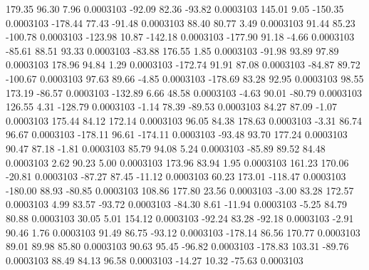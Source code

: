       179.35       96.30        7.96     0.0003103
      -92.09       82.36      -93.82     0.0003103
      145.01        9.05     -150.35     0.0003103
     -178.44       77.43      -91.48     0.0003103
       88.40       80.77        3.49     0.0003103
       91.44       85.23     -100.78     0.0003103
     -123.98       10.87     -142.18     0.0003103
     -177.90       91.18       -4.66     0.0003103
      -85.61       88.51       93.33     0.0003103
      -83.88      176.55        1.85     0.0003103
      -91.98       93.89       97.89     0.0003103
      178.96       94.84        1.29     0.0003103
     -172.74       91.91       87.08     0.0003103
      -84.87       89.72     -100.67     0.0003103
       97.63       89.66       -4.85     0.0003103
     -178.69       83.28       92.95     0.0003103
       98.55      173.19      -86.57     0.0003103
     -132.89        6.66       48.58     0.0003103
       -4.63       90.01      -80.79     0.0003103
      126.55        4.31     -128.79     0.0003103
       -1.14       78.39      -89.53     0.0003103
       84.27       87.09       -1.07     0.0003103
      175.44       84.12      172.14     0.0003103
       96.05       84.38      178.63     0.0003103
       -3.31       86.74       96.67     0.0003103
     -178.11       96.61     -174.11     0.0003103
      -93.48       93.70      177.24     0.0003103
       90.47       87.18       -1.81     0.0003103
       85.79       94.08        5.24     0.0003103
      -85.89       89.52       84.48     0.0003103
        2.62       90.23        5.00     0.0003103
      173.96       83.94        1.95     0.0003103
      161.23      170.06      -20.81     0.0003103
      -87.27       87.45      -11.12     0.0003103
       60.23      173.01     -118.47     0.0003103
     -180.00       88.93      -80.85     0.0003103
      108.86      177.80       23.56     0.0003103
       -3.00       83.28      172.57     0.0003103
        4.99       83.57      -93.72     0.0003103
      -84.30        8.61      -11.94     0.0003103
       -5.25       84.79       80.88     0.0003103
       30.05        5.01      154.12     0.0003103
      -92.24       83.28      -92.18     0.0003103
       -2.91       90.46        1.76     0.0003103
       91.49       86.75      -93.12     0.0003103
     -178.14       86.56      170.77     0.0003103
       89.01       89.98       85.80     0.0003103
       90.63       95.45      -96.82     0.0003103
     -178.83      103.31      -89.76     0.0003103
       88.49       84.13       96.58     0.0003103
      -14.27       10.32      -75.63     0.0003103
